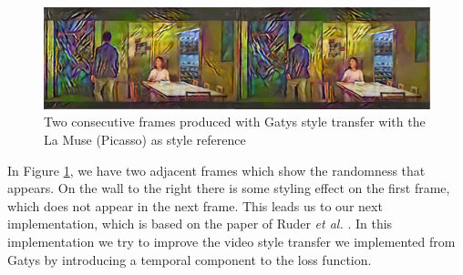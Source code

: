 \begin{figure}[!ht]
\begin{center}
\includegraphics[scale=0.15]{report/Method/images/gatys_adjacent.png}
\caption{Two consecutive frames produced with Gatys style transfer with the La Muse (Picasso) as style reference}
\label{fig:Adjacent frames with ruder}
\end{center}
\end{figure}\newline\newline
In Figure \ref{fig:Adjacent frames with ruder}, we have two adjacent frames which show the randomness that appears. On the wall to the right there is some styling effect on the first frame, which does not appear in the next frame.\newline\newline
This leads us to our next implementation, which is based on the paper of Ruder \textit{et al.} \cite{Ruder:1}. In this implementation we try to improve the video style transfer we implemented from Gatys by introducing a temporal component to the loss function.
